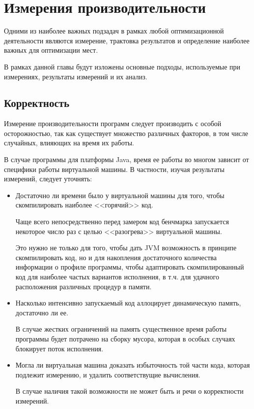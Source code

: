 \newpage
\section{Измерения производительности}
Одними из наиболее важных подзадач в рамках любой оптимизационной деятельности являются измерение,
трактовка результатов и определение наиболее важных для оптимизации мест.

В рамках данной главы будут изложены основные подходы, используемые при измерениях, результаты
измерений и их анализ.

\subsection{Корректность}
Измерение производительности программ следует производить с особой осторожностью, так как существует
множество различных факторов, в том числе случайных, влияющих на время их работы.

В случае программы для платформы Java, время ее работы во многом зависит от специфики работы
виртуальной машины.
В частности, изучая результаты измерений, следует уточнять:
\begin{itemize}
    \item Достаточно ли времени было у виртуальной машины для того, чтобы скомпилировать наиболее
    <<горячий>> код.

    Чаще всего непосредственно перед замером код бенчмарка запускается некоторое число раз с целью
    <<разогрева>> виртуальной машины.

    Это нужно не только для того, чтобы дать JVM возможность в принципе скомпилировать код, но и
    для накопления достаточного количества информации о профиле программы, чтобы адаптировать
    скомпилированный код для наиболее частых вариантов исполнения, в т.ч. для удачного расположения
    различных процедур в памяти.

    \item Насколько интенсивно запускаемый код аллоцирует динамическую память, достаточно ли ее.

    В случае жестких ограничений на память существенное время работы программы будет потрачено
    на сборку мусора, которая в особых случаях блокирует поток исполнения.

    \item Могла ли виртуальная машина доказать избыточность той части кода, которая подлежит
    измерению, и удалить соответствущие вычисления.

    В случае наличия такой возможности не может быть и речи о корректности измерений.
\end{itemize}

